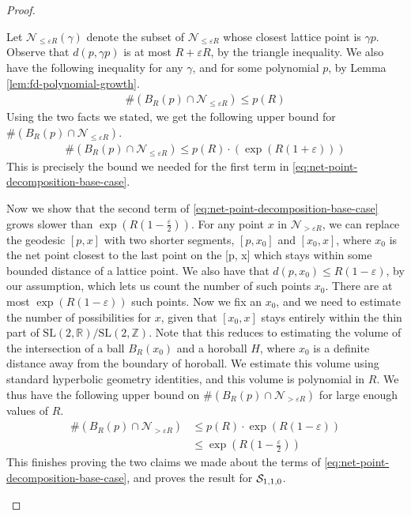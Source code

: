 \documentclass[12pt, reqno]{amsart}
\begin{document}
\begin{proof}
\begin{itemize}
    Let $\mathcal{N}_{\leq \varepsilon R}(\gamma)$ denote the subset of $\mathcal{N}_{\leq \varepsilon R}$ whose closest lattice point is $\gamma p$.
    Observe that $d(p, \gamma p)$ is at most $R + \varepsilon R$, by the triangle inequality.
    We also have the following inequality for any $\gamma$, and for some polynomial $p$, by Lemma \ref{lem:fd-polynomial-growth}.
    \begin{align*}
      \#\left( B_R(p) \cap \mathcal{N}_{\leq \varepsilon R} \right) \leq p(R)
    \end{align*}
    Using the two facts we stated, we get the following upper bound for $\#\left( B_R(p) \cap \mathcal{N}_{\leq \varepsilon R} \right)$.
    \begin{align*}
      \#\left( B_R(p) \cap \mathcal{N}_{\leq \varepsilon R} \right) \leq p(R) \cdot \left( \exp(R(1+\varepsilon)) \right)
    \end{align*}
    This is precisely the bound we needed for the first term in \eqref{eq:net-point-decomposition-base-case}.

    Now we show that the second term of \eqref{eq:net-point-decomposition-base-case} grows slower than $\exp(R(1- \frac{ \varepsilon}{2}))$.
    For any point $x$ in $\mathcal{N}_{> \varepsilon R}$, we can replace the geodesic $[p, x]$ with two shorter segments, $[p, x_0]$ and $[x_0, x]$, where $x_0$ is the net point closest to the last point on the [p, x] which stays within some bounded distance of a lattice point.
    We also have that $d(p, x_0) \leq R(1-\varepsilon)$, by our assumption, which lets us count the number of such points $x_0$.
    There are at most $\exp(R(1-\varepsilon))$ such points.
    Now we fix an $x_0$, and we need to estimate the number of possibilities for $x$, given that $[x_0, x]$ stays entirely within the thin part of $\mathrm{SL}(2, \mathbb{R})/\mathrm{SL}(2, \mathbb{Z})$.
    Note that this reduces to estimating the volume of the intersection of a ball $B_R(x_0)$ and a horoball $H$, where $x_0$ is a definite distance away from the boundary of horoball.
    We estimate this volume using standard hyperbolic geometry identities, and this volume is polynomial in $R$.
    We thus have the following upper bound on $\#\left( B_R(p) \cap \mathcal{N}_{> \varepsilon R} \right) $ for large enough values of $R$.
    \begin{align*}
      \#\left( B_R(p) \cap \mathcal{N}_{> \varepsilon R} \right)  &\leq p(R) \cdot \exp(R(1-\varepsilon)) \\
                                                        &\leq \exp\left(R\left(1 - \frac{\varepsilon}{2}\right)\right)
    \end{align*}
    This finishes proving the two claims we made about the terms of \eqref{eq:net-point-decomposition-base-case}, and proves the result for $\mathcal{S}_{1,1,0}$.


\end{itemize}
\end{proof}
\end{document}
